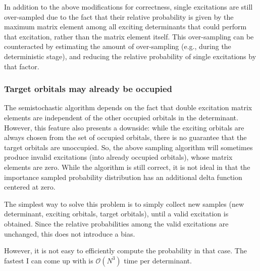 \documentclass[english]{article}
\begin{document}
In addition to the above modifications for correctness, single excitations are still over-sampled due to the fact that their relative probability is given by the maximum matrix element among all exciting determinants that could perform that excitation, rather than the matrix element itself. This over-sampling can be counteracted by estimating the amount of over-sampling (e.g., during the deterministic stage), and reducing the relative probability of single excitations by that factor.

\subsubsection{Target orbitals may already be occupied}
The semistochastic algorithm depends on the fact that double excitation matrix elements are independent of the other occupied orbitals in the determinant. However, this feature also presents a downside: while the exciting orbitals are always chosen from the set of occupied orbitals, there is no guarantee that the target orbitals are unoccupied. So, the above sampling algorithm will sometimes produce invalid excitations (into already occupied orbitals), whose matrix elements are zero. While the algorithm is still correct, it is not ideal in that the importance sampled probability distribution has an additional delta function centered at zero.

The simplest way to solve this problem is to simply collect new samples (new determinant, exciting orbitals, target orbitals), until a valid excitation is obtained. Since the relative probabilities among the valid excitations are unchanged, this does not introduce a bias.

However, it is not easy to efficiently compute the probability in that case. The fastest I can come up with is $\mathcal{O}(N^3)$ time per determinant.
\end{document}
